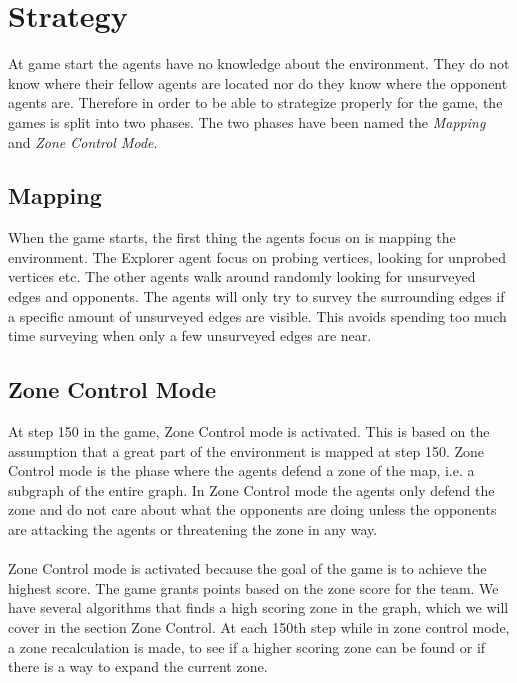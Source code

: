\documentclass[11pt]{article}
\begin{document}
\section{Strategy}
At game start the agents have no knowledge about the environment. They do not know where their fellow agents are located nor do they know where the opponent agents are. Therefore in order to be able to strategize properly for the game, the games is split into two phases. The two phases have been named the \emph{Mapping} and \emph{Zone Control Mode}.

\subsection{Mapping}
When the game starts, the first thing the agents focus on is mapping the environment. The Explorer agent focus on probing vertices, looking for unprobed vertices etc. The other agents walk around randomly looking for unsurveyed edges and opponents. The agents will only try to survey the surrounding edges if a specific amount of unsurveyed edges are visible. This avoids spending too much time surveying when only a few unsurveyed edges are near.

\subsection{Zone Control Mode}
At step 150 in the game, Zone Control mode is activated. This is based on the assumption that a great part of the environment is mapped at step 150. Zone Control mode is the phase where the agents defend a zone of the map, i.e. a subgraph of the entire graph. In Zone Control mode the agents only defend the zone and do not care about what the opponents are doing unless the opponents are attacking the agents or threatening the zone in any way.\\
\\
Zone Control mode is activated because the goal of the game is to achieve the highest score. The game grants points based on the zone score for the team. We have several algorithms that finds a high scoring zone in the graph, which we will cover in the section Zone Control. At each 150th step while in zone control mode, a zone recalculation is made, to see if a higher scoring zone can be found or if there is a way to expand the current zone.
\end{document}
